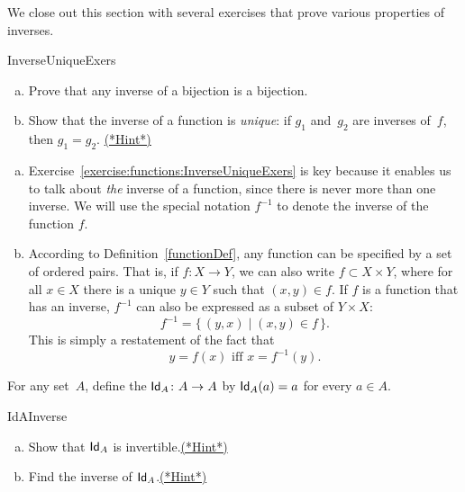 We close out this section with several exercises that prove various properties of inverses.

 \begin{exercise}{InverseUniqueExers} 
 \begin{enumerate}[(a)]
 \item \label{InverseUniqueExers-bij}
 Prove that any inverse of a bijection is a bijection.

 \item \label{InverseUniqueExers-unique}
 Show that the inverse of a function is \emph{unique}: if $g_1$ and~$g_2$ are inverses of~$f$, then $g_1 = g_2$.
\hyperref[sec:functions:hints]{(*Hint*)} 
 \end{enumerate}
 \end{exercise}

\begin{rem}
\begin{enumerate}[(a)]
\item
Exercise~\ref{exercise:functions:InverseUniqueExers} is key because it enables us to talk about \emph{the} inverse of a function, since there is never more than one inverse. We will use the special notation $f^{-1}$ to denote the inverse of the function $f$.
\item
According to Definition~\ref{functionDef}, any function can be specified by a set of ordered pairs. That is, if $f:X \rightarrow Y$, we can also write $f \subset X \times Y$, where for all $x \in X$ there is a unique $y \in Y$ such that $(x,y) \in f$. If $f$ is a function that has an inverse, $f^{-1}$ can also be expressed as a subset of $Y \times X$: 
$$ f^{-1} = \{\, (y,x) \mid (x,y) \in f \,\} .$$
This is simply a restatement of the fact that
 $$y = f(x) \text{ iff } x = f^{-1}(y) .$$
\end{enumerate}
\end{rem}

\begin{defn}\label{identityMap}
For any set~$A$, define the  ${\sf Id}_A \colon A \to A$ by ${\sf Id}_A(a) = a$ for every $a \in A$.
\end{defn} 

\begin{exercise}{IdAInverse}
\begin{enumerate}[(a)]
\item
Show that ${\sf Id}_A$ is invertible.\hyperref[sec:functions:hints]{(*Hint*)}
\item
Find the inverse of ${\sf Id}_A$.\hyperref[sec:functions:hints]{(*Hint*)}
\end{enumerate}
\end{exercise}

